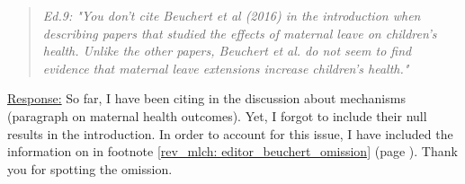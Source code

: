 


\bigskip
{}
\begin{quote}
	\textit{Ed.9: "You don’t cite Beuchert et al (2016) in the introduction when describing papers that studied the effects of maternal leave on children’s health. Unlike the other papers, Beuchert et al. do not seem to find evidence that maternal leave extensions increase children’s health."}
\end{quote}
\underline{Response:} So far, I have been citing \cite{beuchert2016} in the discussion about mechanisms (paragraph on maternal health outcomes). Yet, I forgot to include their null results in the introduction. In order to account for this issue, I have included the information on \cite{beuchert2016} in footnote \ref{rev_mlch: editor_beuchert_omission} (page \pageref{rev_mlch: editor_beuchert_omission}). Thank you for spotting the omission.
